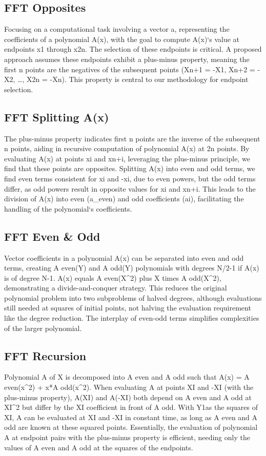 \subsection*{FFT  Opposites}
Focusing on a computational task involving a vector a, representing the coefficients of a polynomial A(x), with the goal to compute A(x)`s value at endpoints x1 through x2n.
The selection of these endpoints is critical.
A proposed approach assumes these endpoints exhibit a plus-minus property, meaning the first n points are the negatives of the subsequent points (Xn+1 = -X1, Xn+2 = -X2, \ldots, X2n = -Xn).
This property is central to our methodology for endpoint selection.

\subsection*{FFT  Splitting A(x)}
The plus-minus property indicates first n points are the inverse of the subsequent n points, aiding in recursive computation of polynomial A(x) at 2n points.
By evaluating A(x) at points xi and xn+i, leveraging the plus-minus principle, we find that these points are opposites.
Splitting A(x) into even and odd terms, we find even terms consistent for xi and -xi, due to even powers, but the odd terms differ, as odd powers result in opposite values for xi and xn+i.
This leads to the division of A(x) into even (a\_even) and odd coefficients (ai), facilitating the handling of the polynomial`s coefficients.

\subsection*{FFT  Even \& Odd}
Vector coefficients in a polynomial A(x) can be separated into even and odd terms, creating A even(Y) and A odd(Y) polynomials with degrees N/2-1 if A(x) is of degree N-1.
A(x) equals A even(X\textasciicircum{}2) plus X times A odd(X\textasciicircum{}2), demonstrating a divide-and-conquer strategy.
This reduces the original polynomial problem into two subproblems of halved degrees, although evaluations still needed at squares of initial points, not halving the evaluation requirement like the degree reduction.
The interplay of even-odd terms simplifies complexities of the larger polynomial.

\subsection*{FFT  Recursion}
Polynomial A of X is decomposed into A even and A odd such that A(x) = A even(x\textasciicircum{}2) + x*A odd(x\textasciicircum{}2).
When evaluating A at points XI and -XI (with the plus-minus property), A(XI) and A(-XI) both depend on A even and A odd at XI\textasciicircum{}2 but differ by the XI coefficient in front of A odd.
With Y1\ldotsYN as the squares of XI\ldotsXN, A can be evaluated at XI and -XI in constant time, as long as A even and A odd are known at these squared points.
Essentially, the evaluation of polynomial A at endpoint pairs with the plus-minus property is efficient, needing only the values of A even and A odd at the squares of the endpoints.

